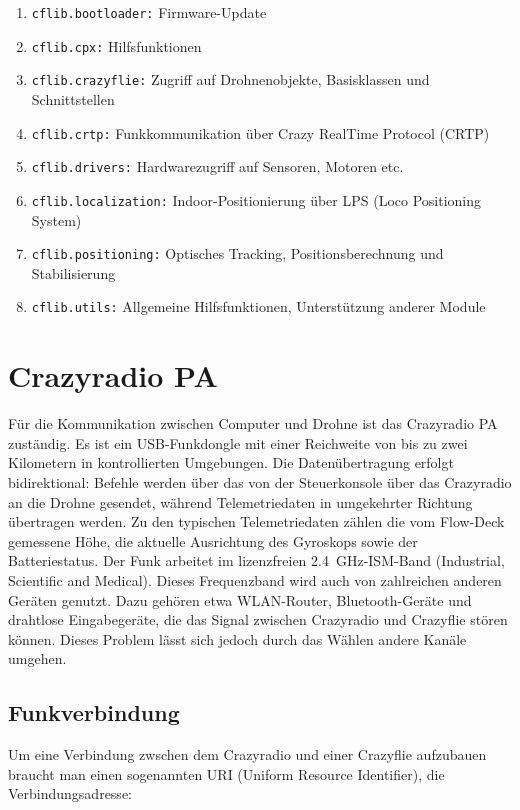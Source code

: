 \begin{enumerate}
    \item \texttt{cflib.bootloader:} Firmware-Update
    \item \texttt{cflib.cpx:} Hilfsfunktionen
    \item \texttt{cflib.crazyflie:} Zugriff auf Drohnenobjekte, Basisklassen und Schnittstellen
    \item \texttt{cflib.crtp:} Funkkommunikation über Crazy RealTime Protocol (CRTP)
    \item \texttt{cflib.drivers:} Hardwarezugriff auf Sensoren, Motoren etc.
    \item \texttt{cflib.localization:} Indoor-Positionierung über LPS (Loco Positioning System)
    \item \texttt{cflib.positioning:} Optisches Tracking, Positionsberechnung und Stabilisierung
    \item \texttt{cflib.utils:} Allgemeine Hilfsfunktionen, Unterstützung anderer Module
\end{enumerate}

\section{Crazyradio PA}
\label{sec:crpa}
Für die Kommunikation zwischen Computer und Drohne ist das Crazyradio PA zuständig.
Es ist ein USB-Funkdongle mit einer Reichweite von bis zu zwei Kilometern in kontrollierten Umgebungen.
Die Datenübertragung erfolgt bidirektional:
Befehle werden über das  von der Steuerkonsole über das Crazyradio an die Drohne gesendet, während Telemetriedaten in umgekehrter Richtung übertragen werden.
Zu den typischen Telemetriedaten zählen die vom Flow-Deck gemessene Höhe, die aktuelle Ausrichtung des Gyroskops sowie der Batteriestatus.
Der Funk arbeitet im lizenzfreien \SI{2.4}{\giga\hertz}-ISM-Band (Industrial, Scientific and Medical).
Dieses Frequenzband wird auch von zahlreichen anderen Geräten genutzt. Dazu gehören etwa WLAN-Router, Bluetooth-Geräte und drahtlose Eingabegeräte, die das Signal zwischen Crazyradio und Crazyflie stören können. Dieses Problem lässt sich jedoch durch das Wählen andere Kanäle umgehen. \cite{bc:crpa_conf}

\subsection{Funkverbindung}
Um eine Verbindung zwschen dem Crazyradio und einer Crazyflie aufzubauen braucht man einen sogenannten URI (Uniform Resource Identifier), die Verbindungsadresse:

